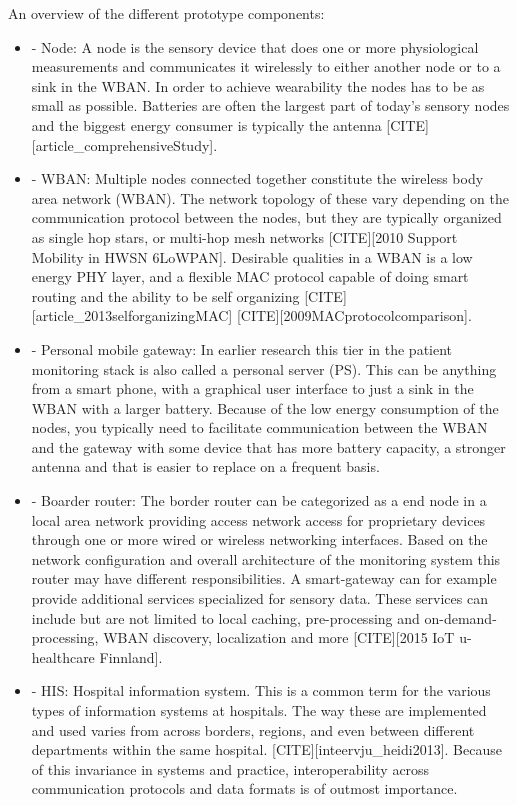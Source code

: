An overview of the different prototype components:
\begin{itemize}

  \item - Node: A node is the sensory device that does one or more physiological measurements and communicates it wirelessly to either another node or to a sink in the WBAN. In order to achieve wearability the nodes has to be as small as possible. Batteries are often the largest part of today’s sensory nodes and the biggest energy consumer is typically the antenna [CITE][article_comprehensiveStudy].

  \item - WBAN: Multiple nodes connected together constitute the wireless body area network (WBAN). The network topology of these vary depending on the communication protocol between the nodes, but they are typically organized as single hop stars, or multi-hop mesh networks [CITE][2010 Support Mobility in HWSN 6LoWPAN]. Desirable qualities in a WBAN is a low energy PHY layer, and a flexible MAC protocol capable of doing smart routing and the ability to be self organizing [CITE][article_2013selforganizingMAC] [CITE][2009MACprotocolcomparison].

  \item - Personal mobile gateway: In earlier research this tier in the patient monitoring stack is also called a personal server (PS). This can be anything from a smart phone, with a graphical user interface to just a sink in the WBAN with a larger battery. Because of the low energy consumption of the nodes, you typically need  to facilitate communication between the WBAN and the gateway with some device that has more battery capacity, a stronger antenna and that is easier to replace on a frequent basis.

  \item - Boarder router: The border router can be categorized as a end node in a local area network providing access network access for proprietary devices through one or more wired or wireless networking interfaces. Based on the network configuration and overall architecture of the monitoring system this router may have different responsibilities. A smart-gateway can for example provide additional services specialized for sensory data. These services can include but are not limited to local caching, pre-processing and on-demand-processing, WBAN discovery, localization and more [CITE][2015 IoT u-healthcare Finnland].

  \item - HIS: Hospital information system. This is a common term for the various types of information systems at hospitals. The way these are implemented and used varies from across borders, regions, and even between different departments within the same hospital. [CITE][inteervju_heidi2013]. Because of this invariance in systems and practice, interoperability across communication protocols and data formats is of outmost importance.

\end{itemize}

